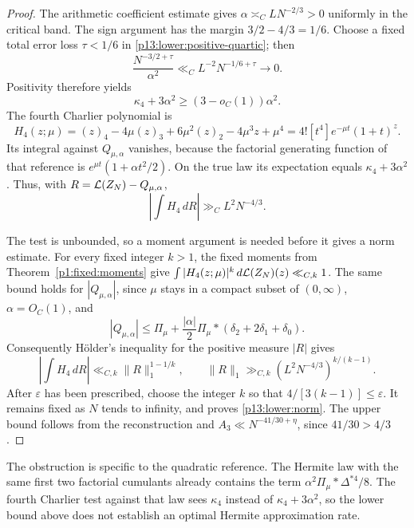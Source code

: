 \begin{proof}
The arithmetic coefficient estimate gives
$\alpha\asymp_C LN^{-2/3}>0$ uniformly in the critical band.
The sign argument has the margin $3/2-4/3=1/6$.
Choose a fixed total error loss $\tau<1/6$ in
\eqref{p13:lower:positive-quartic}; then
\[
 \frac{N^{-3/2+\tau}}{\alpha^2}
 \ll_C L^{-2}N^{-1/6+\tau}\longrightarrow0.
\]
Positivity therefore yields
\[
 \kappa_4+3\alpha^2\geq (3-o_C(1))\alpha^2.
\]
The fourth Charlier polynomial is
\[
 H_4(z;\mu)=(z)_4-4\mu(z)_3+6\mu^2(z)_2-4\mu^3z+\mu^4
          =4![t^4]e^{-\mu t}(1+t)^z.
\]
Its integral against $Q_{\mu,\alpha}$ vanishes, because the factorial
generating function of that reference is
$e^{\mu t}(1+\alpha t^2/2)$. On the true law its expectation equals
$\kappa_4+3\alpha^2$. Thus, with
$R=\mathcal L(Z_N)-Q_{\mu,\alpha}$,
\[
 \left|\int H_4\,dR\right|\gg_C L^2N^{-4/3}.
\]

The test is unbounded, so a moment argument is needed before it gives
a norm estimate. For every fixed integer $k>1$, the fixed moments from
Theorem~\ref{p1:fixed:moments} give
$\int |H_4(z;\mu)|^k\,d\mathcal L(Z_N)(z)\ll_{C,k}1$.
The same bound holds for $|Q_{\mu,\alpha}|$, since $\mu$ stays in a
compact subset of $(0,\infty)$, $\alpha=O_C(1)$, and
\[
 |Q_{\mu,\alpha}|
 \leq\Pi_\mu+\frac{|\alpha|}{2}
       \Pi_\mu*(\delta_2+2\delta_1+\delta_0).
\]
Consequently H\"older's inequality for the positive measure $|R|$ gives
\[
 \left|\int H_4\,dR\right|
 \ll_{C,k}\|R\|_1^{1-1/k},\qquad
 \|R\|_1\gg_{C,k}(L^2N^{-4/3})^{k/(k-1)}.
\]
After $\varepsilon$ has been prescribed, choose the integer $k$ so that
$4/[3(k-1)]\leq\varepsilon$. It remains fixed as $N$ tends to infinity,
and proves \eqref{p13:lower:norm}. The upper bound follows from the
reconstruction and $A_3\ll N^{-41/30+\eta}$, since $41/30>4/3$.
\end{proof}

The obstruction is specific to the quadratic reference. The Hermite law
with the same first two factorial cumulants already contains the term
$\alpha^2\Pi_\mu*\Delta^{*4}/8$. The fourth Charlier test against that
law sees $\kappa_4$ instead of $\kappa_4+3\alpha^2$, so the lower bound
above does not establish an optimal Hermite approximation rate.
